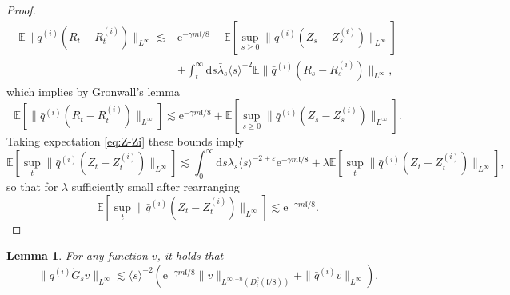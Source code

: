 \documentclass[11pt, a4paper]{scrartcl}
\numberwithin{equation}{section}
\theoremstyle{plain}
\newtheorem{lemma}[foo]{Lemma}
\theoremstyle{remark}
\newcommand{\mathd}{\mathrm{d}}
\newcommand{\mathe}{\mathrm{e}}
\begin{document}
\begin{proof}
\[\begin{aligned}
			\mathbb{E}\| \bar{q}^{(i)} (R_t - R_t^{(i)}) \|_{L^{\infty}}
			\lesssim & \mathe^{- \gamma m\mathfrak{l}/ 8} +\mathbb{E} \left[\sup_{s
			\geqslant 0} \| \bar{q}^{(i)} (Z_s - Z_s^{(i)}) \|_{L^{\infty}}\right]  \\
			         & +
			\int_t^{\infty} \mathd s \bar{\lambda}_s \langle s \rangle^{- 2} \mathbb{E}
			\| \bar{q}^{(i)} (R_s - R_s^{(i)}) \|_{L^{\infty}},
		\end{aligned} \]
	which implies by Gronwall's lemma
	\[ \mathbb{E} \left[\| \bar{q}^{(i)} (R_t - R_t^{(i)}) \|_{L^{\infty}}\right] \lesssim
		\mathe^{- \gamma m\mathfrak{l}/ 8} +\mathbb{E} \left[\sup_{s \geqslant 0} \|
			\bar{q}^{(i)} (Z_s - Z_s^{(i)}) \|_{L^{\infty}}\right] . \]
	Taking expectation \eqref{eq:Z-Zi} these bounds
	imply
	\[ \mathbb{E} \left[\sup_t \| \bar{q}^{(i)} (Z_t - Z_t^{(i)}) \|_{L^{\infty}}\right]
		\lesssim \int_0^{\infty} \mathd s \bar{\lambda}_s \langle s \rangle^{- 2 +
			\varepsilon} \mathe^{- \gamma m\mathfrak{l}/ 8} + \bar{\lambda} \mathbb{E}
		\left[\sup_t \| \bar{q}^{(i)} (Z_t - Z_t^{(i)}) \|_{L^{\infty}}\right], \]
	so that for $\bar{\lambda}$ sufficiently small after rearranging
	\[ \mathbb{E} \left[\sup_t \| \bar{q}^{(i)} (Z_t - Z_t^{(i)}) \|_{L^{\infty}}\right]
		\lesssim \mathe^{- \gamma m\mathfrak{l}/ 8} . \]
\end{proof}

\begin{lemma}
	\label{lem:rho-G}For any function $v$, it holds that
	\begin{equation}
		\| q^{(i)}  \dot{G}_s v \|_{L^{\infty}} \lesssim \langle s \rangle^{- 2}
		(\mathe^{- \gamma m\mathfrak{l}/ 8} \| v \|_{L^{\infty, - n} (D_i^c
				(\mathfrak{l}/ 8))} + \| \bar{q}^{(i)} v \|_{L^{\infty}}) \label{eq:rho-G}
		.
	\end{equation}
\end{lemma}
\end{document}

